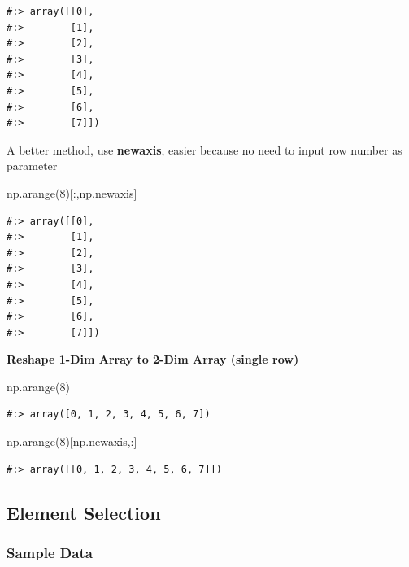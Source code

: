 \documentclass[
]{book}
\newenvironment{Shaded}{\begin{snugshade}}{\end{snugshade}}
\newcommand{\DecValTok}[1]{\textcolor[rgb]{0.06,0.06,0.06}{#1}}
\newcommand{\NormalTok}[1]{#1}
\begin{document}
\begin{verbatim}
#:> array([[0],
#:>        [1],
#:>        [2],
#:>        [3],
#:>        [4],
#:>        [5],
#:>        [6],
#:>        [7]])
\end{verbatim}

A better method, use \textbf{newaxis}, easier because no need to input row number as parameter

\begin{Shaded}
\begin{Highlighting}[]
\NormalTok{np.arange(}\DecValTok{8}\NormalTok{)[:,np.newaxis]}
\end{Highlighting}
\end{Shaded}

\begin{verbatim}
#:> array([[0],
#:>        [1],
#:>        [2],
#:>        [3],
#:>        [4],
#:>        [5],
#:>        [6],
#:>        [7]])
\end{verbatim}

\textbf{Reshape 1-Dim Array to 2-Dim Array (single row)}

\begin{Shaded}
\begin{Highlighting}[]
\NormalTok{np.arange(}\DecValTok{8}\NormalTok{)}
\end{Highlighting}
\end{Shaded}

\begin{verbatim}
#:> array([0, 1, 2, 3, 4, 5, 6, 7])
\end{verbatim}

\begin{Shaded}
\begin{Highlighting}[]
\NormalTok{np.arange(}\DecValTok{8}\NormalTok{)[np.newaxis,:]}
\end{Highlighting}
\end{Shaded}

\begin{verbatim}
#:> array([[0, 1, 2, 3, 4, 5, 6, 7]])
\end{verbatim}

\hypertarget{element-selection}{%
\subsection{Element Selection}\label{element-selection}}

\hypertarget{sample-data-1}{%
\subsubsection{Sample Data}\label{sample-data-1}}
\end{document}
